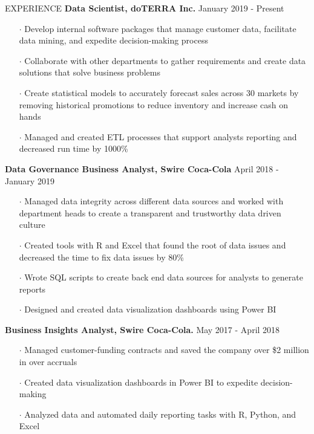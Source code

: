 \documentclass{resume} %
\begin{document}
    
      \begin{rSection}{EXPERIENCE}
    {\bf Data Scientist, doTERRA Inc.} \hfill {January 2019 - Present}
    \begin{itemize}[noitemsep]
      
      \item[$\cdot$] Develop internal software packages that manage customer data, facilitate data mining, and expedite decision-making process
      \item[$\cdot$] Collaborate with other departments to gather requirements and create data solutions that solve business problems
      \item[$\cdot$] Create statistical models to accurately forecast sales across 30 markets by removing historical promotions to reduce inventory and increase cash on hands
      \item[$\cdot$] Managed and created ETL processes that support analysts reporting and decreased run time by 1000\%
    \end{itemize}
    {\bf Data Governance Business Analyst, Swire Coca-Cola} \hfill {April 2018 - January 2019}
    \begin{itemize}[noitemsep]
      \item[$\cdot$] Managed data integrity across different data sources and worked with department heads to create a transparent   and trustworthy data driven culture
      \item[$\cdot$] Created tools with R and Excel that found the root of data issues and decreased the time to fix data issues by 80\%
      \item[$\cdot$] Wrote SQL scripts to create back end data sources for analysts to generate reports
      \item[$\cdot$] Designed and created data visualization dashboards using Power BI
    \end{itemize}
    {\bf Business Insights Analyst, Swire Coca-Cola.} \hfill {May 2017 - April 2018}
    \begin{itemize}[noitemsep]
      \item[$\cdot$] Managed customer-funding contracts and saved the company over \$2 million in over accruals
      \item[$\cdot$] Created data visualization dashboards in Power BI to expedite decision-making
      \item[$\cdot$] Analyzed data and automated daily reporting tasks with R, Python, and Excel

\end{itemize}
\end{rSection}
\end{document}
